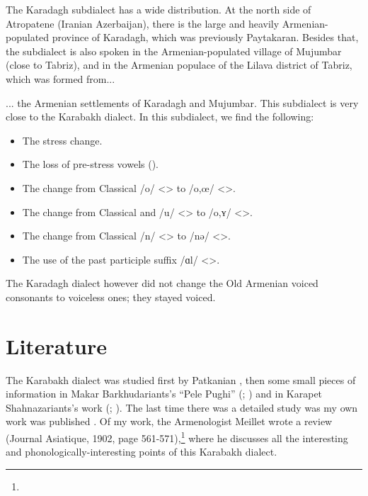 The Karadagh subdialect has a wide distribution. At the north side of Atropatene (Iranian Azerbaijan), there is the large and heavily Armenian-populated province of Karadagh, which was   previously Paytakaran. Besides that, the subdialect is also spoken in the Armenian-populated village of Mujumbar (close to Tabriz), and in the Armenian populace of the Lilava district of Tabriz, which was formed from... 


\begin{adjarianpage}\label{page:71}\end{adjarianpage}%

... the Armenian settlements of Karadagh and Mujumbar. This subdialect is very close to the Karabakh dialect. In this subdialect, we find the following:\begin{itemize}
	\item The stress change.
	\item The loss of pre-stress vowels ().
	\item The change from Classical /o/ <> to /o,œ/ <>.
	\item The change from Classical and /u/ <> to /o,ʏ/ <>. 
	\item The change from Classical /n/ <> to /nə/ <>. 
	\item The use of the past participle suffix  /ɑl/ <>. 
\end{itemize}

The Karadagh dialect however did not change the Old Armenian voiced consonants to voiceless ones; they stayed voiced. 

\section{Literature}

The Karabakh dialect was studied first by Patkanian \citep[55-73]{Patkanian-1869-RussianDialects}, then some small pieces of information in Makar Barkhudariants's ``Pele Pughi'' (; ) and in Karapet Shahnazariants's work (; ). The last time there was a detailed study was my own work was published \citep{Adjarian-1901-Kharabagh}. Of my work, the Armenologist Meillet wrote a review (Journal Asiatique, 1902, page 561-571),\footnote{} where he discusses all the interesting and phonologically-interesting points of this Karabakh dialect. 

